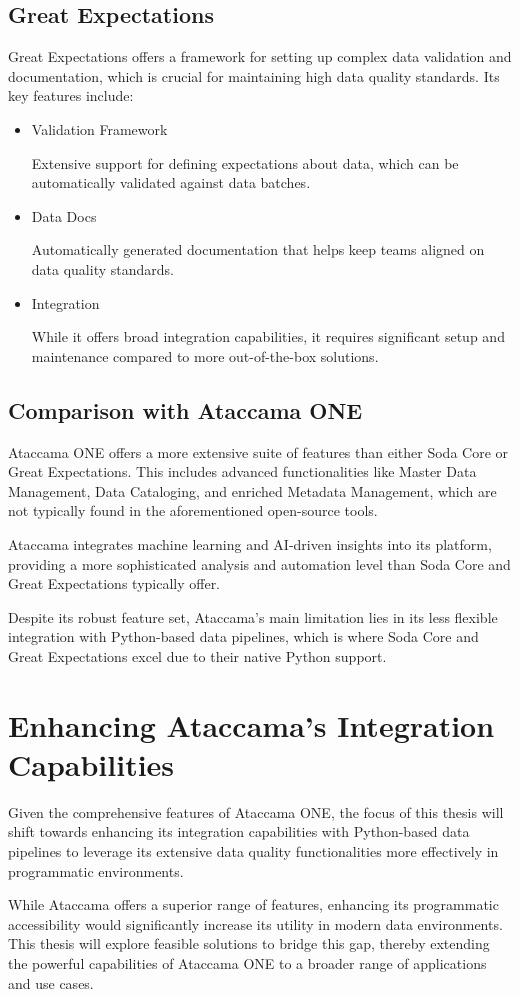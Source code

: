 \subsection{Great Expectations}

Great Expectations offers a framework for setting up complex data validation and documentation, which is crucial for maintaining high data quality standards. Its key features include:

\begin{itemize}
    \item   Validation Framework
    
    Extensive support for defining expectations about data, which can be automatically validated against data batches.

    \item Data Docs
    
    Automatically generated documentation that helps keep teams aligned on data quality standards.

    \item Integration
    
    While it offers broad integration capabilities, it requires significant setup and maintenance compared to more out-of-the-box solutions.
\end{itemize}


\subsection{Comparison with Ataccama ONE}

Ataccama ONE offers a more extensive suite of features than either Soda Core or Great Expectations. This includes advanced functionalities like Master Data Management, Data Cataloging, and enriched Metadata Management, which are not typically found in the aforementioned open-source tools.

Ataccama integrates machine learning and AI-driven insights into its platform, providing a more sophisticated analysis and automation level than Soda Core and Great Expectations typically offer.

Despite its robust feature set, Ataccama’s main limitation lies in its less flexible integration with Python-based data pipelines, which is where Soda Core and Great Expectations excel due to their native Python support.

\section{Enhancing Ataccama's Integration Capabilities}

Given the comprehensive features of Ataccama ONE, the focus of this thesis will shift towards enhancing its integration capabilities with Python-based data pipelines to leverage its extensive data quality functionalities more effectively in programmatic environments.

While Ataccama offers a superior range of features, enhancing its programmatic accessibility would significantly increase its utility in modern data environments. This thesis will explore feasible solutions to bridge this gap, thereby extending the powerful capabilities of Ataccama ONE to a broader range of applications and use cases.
